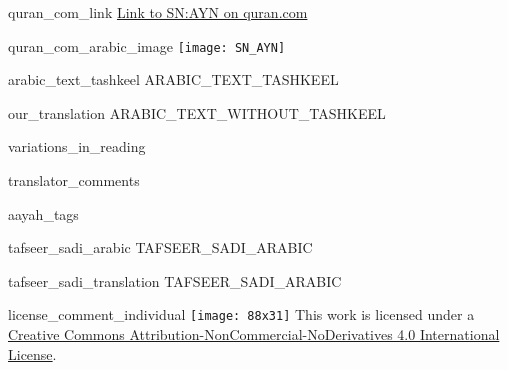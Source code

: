 \begin{comment}
The following strings are to be replaced by a script, in order to use this file as a template:-
* SN = sūrah number, without leading zeros
* AYN = āyah number, without leading zeros
* ARABIC_TEXT_TASHKEEL = the text of the aayah, with tashkeel marks
* ARABIC_TEXT_WITHOUT_TASHKEEL = the text of the aayah, without tashkeel marks
* TAFSEER_SADI_ARABIC = the tafseer of the aayah from as-sa'di
\end{comment}
\begin{comment}
The following tags are declared here:-
quran_com_link
quran_com_arabic_image
arabic_text_tashkeel
our_translation
variations_in_reading
translator_comments
aayah_tags
tafseer_sadi_arabic
tafseer_sadi_translation
license_comment_individual
\end{comment}
\begin{taggedblock}{quran_com_link}
\href{http://quran.com/SN/AYN}{Link to SN:AYN on quran.com}
\end{taggedblock}
\begin{taggedblock}{quran_com_arabic_image}
\texttt{[image: SN\_AYN]}
\end{taggedblock}
\begin{taggedblock}{arabic_text_tashkeel}
ARABIC_TEXT_TASHKEEL
\end{taggedblock}
\begin{taggedblock}{our_translation}
ARABIC_TEXT_WITHOUT_TASHKEEL
\end{taggedblock}
\begin{taggedblock}{variations_in_reading}
\end{taggedblock}
\begin{taggedblock}{translator_comments}
\end{taggedblock}
\begin{taggedblock}{aayah_tags}
\end{taggedblock}
\begin{taggedblock}{tafseer_sadi_arabic}
TAFSEER_SADI_ARABIC
\end{taggedblock}
\begin{taggedblock}{tafseer_sadi_translation}
TAFSEER_SADI_ARABIC
\end{taggedblock}
\begin{taggedblock}{license_comment_individual}
\texttt{[image: 88x31]}
This work is licensed under a 
\href{http://creativecommons.org/licenses/by-nc-nd/4.0/}{Creative Commons Attribution-NonCommercial-NoDerivatives 4.0 International License}.
\end{taggedblock}
\begin{comment}
Please use the following for footnotes:- Sample\footnoteQ{Text of Qur'an footnote goes here.}.
Sample\footnoteT{Text of Tafseer footnote goes here.}.
\end{comment}